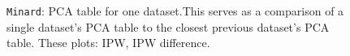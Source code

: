 \documentclass[12pt]{article}
\begin{document}
\begin{figure}
\centering
\noindent{}
  \caption{\centering \texttt{Minard}: PCA table for one dataset.\hspace{\textwidth}This serves as a comparison of a single dataset's PCA table to the closest previous dataset's PCA table. These plots: IPW, IPW difference.}
  \label{fig:tab1}
\end{figure}
\end{document}
